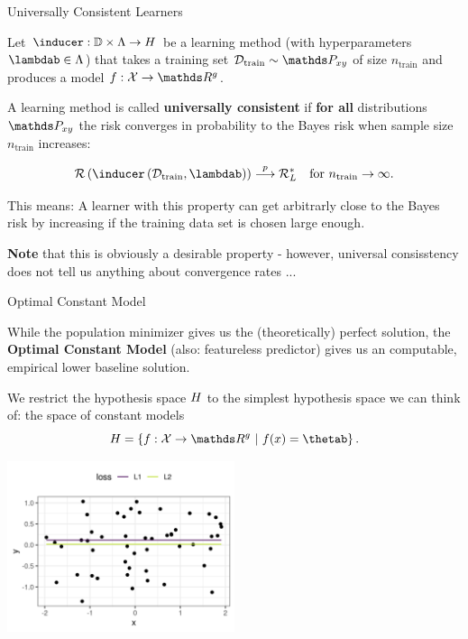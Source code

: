 \begin{vbframe}{Universally Consistent Learners}

Let $\inducer:\mathbb{D}\times \Lambda \to \Hspace$ be a learning method (with hyperparameters $\lambdab \in \Lambda$) that takes a training set $\Dtrain \sim \Pxy$ of size $n_\text{train}$ and produces a model $f: \Xspace \to \R^g$. 

\lz 

A learning method is called \textbf{universally consistent} if \textbf{for all} distributions $\Pxy$ the risk converges in probability to the Bayes risk when sample size $n
_\text{train}$ increases: 

$$
	\risk\left(\inducer\left(\Dtrain, \lambdab\right)\right) \overset{p}{\longrightarrow} \risk^\ast_L \quad \text{for } n_\text{train} \to \infty.
$$

This means: A learner with this property can get arbitrarly close to the Bayes risk by increasing if the training data set is chosen large enough. 

\lz 

\textbf{Note } that this is obviously a desirable property - however, universal consisstency does not tell us anything about convergence rates ...

\end{vbframe}

\begin{vbframe}{Optimal Constant Model}

While the population minimizer gives us the (theoretically) perfect solution, the \textbf{Optimal Constant Model} (also: featureless predictor) gives us an computable, empirical lower baseline solution.

\vspace*{0.2cm}

We restrict the hypothesis space $H$ to the simplest hypothesis space we can think of: the space of constant models $$\Hspace = \left\{f: \Xspace \to \R^g~|~ \fx = \thetab\right\}.$$

\vspace*{-0.5cm}

\begin{center}
	\includegraphics[width = 0.5\textwidth]{figure_man/l1_vs_l2.png}
\end{center}

\end{vbframe}







\endlecture

 